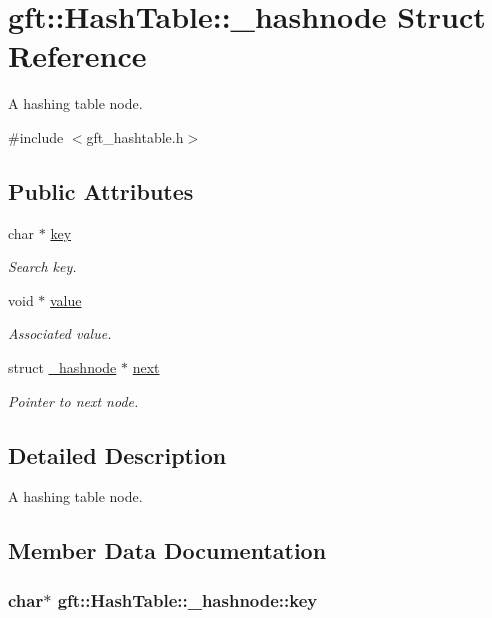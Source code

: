 \hypertarget{structgft_1_1HashTable_1_1__hashnode}{\section{gft\-:\-:Hash\-Table\-:\-:\-\_\-hashnode Struct Reference}
\label{structgft_1_1HashTable_1_1__hashnode}
}


A hashing table node.  




{\ttfamily \#include $<$gft\-\_\-hashtable.\-h$>$}

\subsection*{Public Attributes}
\begin{DoxyCompactItemize}
\item 
char $\ast$ \hyperlink{structgft_1_1HashTable_1_1__hashnode_a6eb232e6a3259f802947f1968288e319}{key}
\begin{DoxyCompactList}\small\item\em Search key. \end{DoxyCompactList}\item 
void $\ast$ \hyperlink{structgft_1_1HashTable_1_1__hashnode_a2e02f3fdfd0d509ca0ec8dbdd57e19de}{value}
\begin{DoxyCompactList}\small\item\em Associated value. \end{DoxyCompactList}\item 
struct \hyperlink{structgft_1_1HashTable_1_1__hashnode}{\-\_\-hashnode} $\ast$ \hyperlink{structgft_1_1HashTable_1_1__hashnode_ab30373c898ea03781984ea757fa439f5}{next}
\begin{DoxyCompactList}\small\item\em Pointer to next node. \end{DoxyCompactList}\end{DoxyCompactItemize}


\subsection{Detailed Description}
A hashing table node. 

\subsection{Member Data Documentation}
\hypertarget{structgft_1_1HashTable_1_1__hashnode_a6eb232e6a3259f802947f1968288e319}{
\subsubsection[{key}]{\setlength{\rightskip}{0pt plus 5cm}char$\ast$ gft\-::\-Hash\-Table\-::\-\_\-hashnode\-::key}}\label{structgft_1_1HashTable_1_1__hashnode_a6eb232e6a3259f802947f1968288e319}


